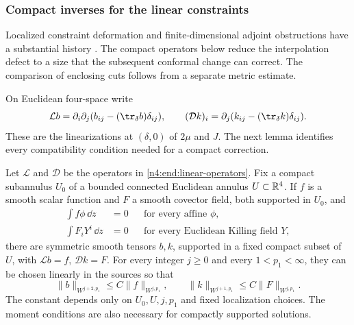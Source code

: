 \subsubsection{Compact inverses for the linear constraints}

Localized constraint deformation and finite-dimensional adjoint
obstructions have a substantial history
\cite{CorvinoSchoen2006,ChruscielDelay2003}. The compact operators
below reduce the interpolation defect to a size that the subsequent
conformal change can correct. The comparison of enclosing cuts follows
from a separate metric estimate.

On Euclidean four-space write
\begin{equation}\label{n4:end:linear-operators}
 \mathcal L b=\partial_i\partial_j
                  (b_{ij}-(\tr_\delta b)\delta_{ij}),\qquad
 (\mathcal D k)_i=\partial_j
                  (k_{ij}-(\tr_\delta k)\delta_{ij}).
\end{equation}
These are the linearizations at \((\delta,0)\) of \(2\mu\) and \(J\).
The next lemma identifies every compatibility condition needed for a
compact correction.

\begin{lemma}\label{n4:end:compact-inverses}
Let \(\mathcal L\) and \(\mathcal D\) be the operators in
\eqref{n4:end:linear-operators}. Fix a compact subannulus \(U_0\) of a
bounded connected Euclidean annulus \(U\subset\mathbb R^4\).
If \(f\) is a smooth scalar function and \(F\) a smooth covector field,
both supported in \(U_0\), and
\begin{equation}\label{n4:end:compatibility}
 \begin{aligned}
 \int f\phi\,\dd z&=0 &&\text{for every affine }\phi,\\
 \int F_iY^i\,\dd z&=0 &&\text{for every Euclidean Killing field }Y,
 \end{aligned}
\end{equation}
there are symmetric smooth tensors \(b,k\), supported in a fixed compact
subset of \(U\), with \(\mathcal Lb=f\), \(\mathcal Dk=F\).
For every integer \(j\ge0\) and every \(1<p_1<\infty\), they can be
chosen linearly in the sources so that
\begin{equation}\label{n4:end:inverse-bounds}
 \|b\|_{W^{j+2,p_1}}\le C\|f\|_{W^{j,p_1}},\qquad
 \|k\|_{W^{j+1,p_1}}\le C\|F\|_{W^{j,p_1}}.
\end{equation}
The constant depends only on \(U_0,U,j,p_1\) and fixed localization
choices. The moment conditions are also necessary for compactly
supported solutions.
\end{lemma}

